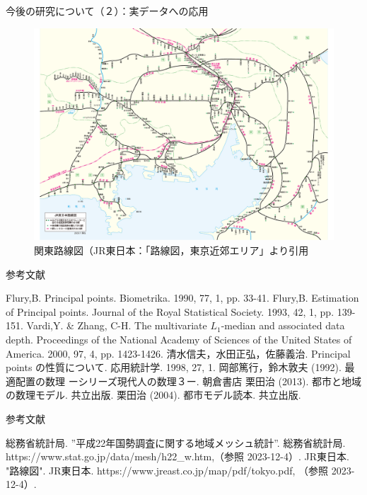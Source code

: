 \documentclass[unicode,11pt]{beamer}
\begin{document}
\begin{frame}{今後の研究について（２）：実データへの応用}
\begin{figure}[htbp]
        \begin{minipage}[b]{0.45\linewidth}
            \centering
            \includegraphics[keepaspectratio, scale=0.15]{tokyo.pdf}
            \caption{関東路線図（JR東日本：「路線図，東京近郊エリア」より引用}
        \end{minipage}
    \end{figure}
\end{frame}

\begin{frame}{参考文献}
    \begin{thebibliography}{99}
        Flury,B. Principal points. Biometrika. 1990, 77, 1, pp. 33-41.
        Flury,B. Estimation of Principal points. Journal of the Royal  Statistical Society. 1993, 42, 1, pp. 139-151.
        Vardi,Y. \& Zhang, C-H. The multivariate $L_1$-median and associated data depth. Proceedings of the National Academy of Sciences of the United States of America. 2000, 97, 4, pp. 1423-1426.
        清水信夫，水田正弘，佐藤義治. Principal points の性質について. 応用統計学. 1998, 27, 1.
        岡部篤行，鈴木敦夫 (1992). 最適配置の数理 ーシリーズ現代人の数理３ー. 朝倉書店
        栗田治 (2013). 都市と地域の数理モデル. 共立出版.
        栗田治 (2004). 都市モデル読本. 共立出版.
    \end{thebibliography}
\end{frame}

\begin{frame}{参考文献}
    \begin{thebibliography}{99}
        総務省統計局. ”平成22年国勢調査に関する地域メッシュ統計”. 総務省統計局. https://www.stat.go.jp/data/mesh/h22\_w.htm,（参照 2023-12-4）.
        JR東日本. "路線図". JR東日本. https://www.jreast.co.jp/map/pdf/tokyo.pdf, （参照 2023-12-4）.
    \end{thebibliography}
\end{frame}
\end{document}
